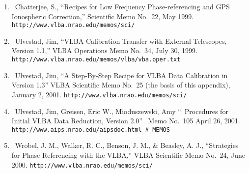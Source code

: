 
\begin{enumerate}

\item\ {Chatterjee, S., ``Recipes for Low Frequency 
Phase-referencing and GPS Ionospheric Correction,'' 
Scientific Memo No.~22, May 1999.\hfill\break
{\tt http://www.vlba.nrao.edu/memos/sci/}}

\item\ {Ulvestad, Jim, ``VLBA Calibration Transfer with External
Telescopes, Version 1.1,''  VLBA Operations Memo No.~34, July 30,
1999. {\tt http://www.vlba.nrao.edu/memos/vlba/vba.oper.txt}}

\item\ {Ulvestad, Jim, ``A Step-By-Step Recipe for VLBA Data
Calibration in \AIPS\, Version 1.3'' VLBA Scientific Memo No.~25 (the
basis of this appendix), January 2, 2001.\hfill\break
{\tt http://www.vlba.nrao.edu/memos/sci/}}

\item\ {Ulvestad, Jim, Greisen, Eric W., Mioduszewski, Amy
``\AIPS\ Procedures for Initial VLBA Data Reduction, Version
2.0'' \AIPS\ Memo No.~105 April 26, 2001.\hfill\break
{\tt http://www.aips.nrao.edu/aipsdoc.html \# MEMOS}}

\item\ {Wrobel, J. M., Walker, R. C., Benson, J. M., \& Beasley, A. J.,
``Strategies for Phase Referencing with the VLBA,'' VLBA Scientific
Memo No.~24, June 2000.\hfill\break
{\tt http://www.vlba.nrao.edu/memos/sci/}}

\end{enumerate}



\bre
{}
\ere


